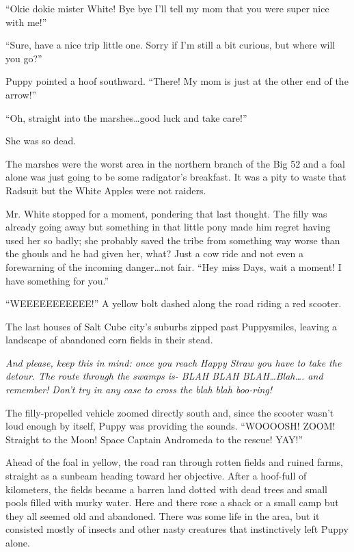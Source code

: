 ``Okie dokie mister White! Bye bye I'll tell my mom that you were super nice with me!''

``Sure, have a nice trip little one. Sorry if I'm still a bit curious, but where will you go?''

Puppy pointed a hoof southward. ``There! My mom is just at the other end of the arrow!''

``Oh, straight into the marshes\dots good luck and take care!''

She was so dead.

The marshes were the worst area in the northern branch of the Big 52 and a foal alone was just going to be some radigator's breakfast. It was a pity to waste that Radsuit but the White Apples were not raiders.

Mr. White stopped for a moment, pondering that last thought. The filly was already going away but something in that little pony made him regret having used her so badly; she probably saved the tribe from something way worse than the ghouls and he had given her, what? Just a cow ride and not even a forewarning of the incoming danger\dots not fair. ``Hey miss Days, wait a moment! I have something for you.''

\horizonline


``WEEEEEEEEEEE!'' A yellow bolt dashed along the road riding a red scooter.

The last houses of Salt Cube city's suburbs zipped past Puppysmiles, leaving a landscape of abandoned corn fields in their stead.

\emph{And please, keep this in mind: once you reach Happy Straw you have to take the detour. The route through the swamps is- BLAH BLAH BLAH\dots Blah\dots. and remember! Don't try in any case to cross the blah blah boo-ring!}

The filly-propelled vehicle zoomed directly south and, since the scooter wasn't loud enough by itself, Puppy was providing the sounds. ``WOOOOSH! ZOOM! Straight to the Moon! Space Captain Andromeda to the rescue! YAY!''

Ahead of the foal in yellow, the road ran through rotten fields and ruined farms, straight as a sunbeam heading toward her objective. After a hoof-full of kilometers, the fields became a barren land dotted with dead trees and small pools filled with murky water. Here and there rose a shack or a small camp but they all seemed old and abandoned. There was some life in the area, but it consisted mostly of insects and other nasty creatures that instinctively left Puppy alone.

